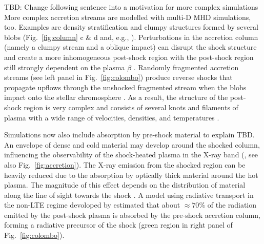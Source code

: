 {\color{red} TBD: Change following sentence into a motivation for more complex simulations}
More complex accretion streams are modelled with multi-D MHD simulations, too. Examples are density stratification and clumpy structures formed by several blobs (Fig.~\ref{fig:column} c \& d and, e.g., \cite{Matsakos_2013,Colombo_2016}). Perturbations in the accretion column (namely a clumpy stream and a oblique impact) can disrupt the shock structure and create a more inhomogeneous post-shock region with the post-shock region still strongly dependent on the plasma $\beta$ \cite{Matsakos_2013}.
Randomly fragmented accretion streams (see left panel in Fig.~\ref{fig:colombo}) produce reverse shocks that propagate upflows through the unshocked fragmented stream when the blobs impact onto the stellar chromosphere \cite{Colombo_2016}.
As a result, the structure of the post-shock region is very complex and consists of several knots and filaments of plasma with a wide range of velocities, densities, and temperatures \cite{Colombo_2016}.

Simulations now also include absorption by pre-shock material {\color{red} to explain TBD}. An envelope of dense and cold material may develop around the shocked column, influencing the observability of the shock-heated plasma in the X-ray band (\citep{Orlando_2013}, see also Fig.~\ref{fig:accretion}). The X-ray emission from the shocked region can be heavily reduced due to the absorption by  optically thick material around the hot plasma. The magnitude of this effect depends on the distribution of material along the line of sight towards the shock \cite{Bonito_2014}. A model using radiative transport in the non-LTE regime devoloped by \cite{Colombo_2019b} estimated that about $\approx 70$\% of the radiation emitted by the post-shock plasma is absorbed by the pre-shock accretion column, forming a radiative precursor of the shock (green region in right panel of Fig.~\ref{fig:colombo}).

